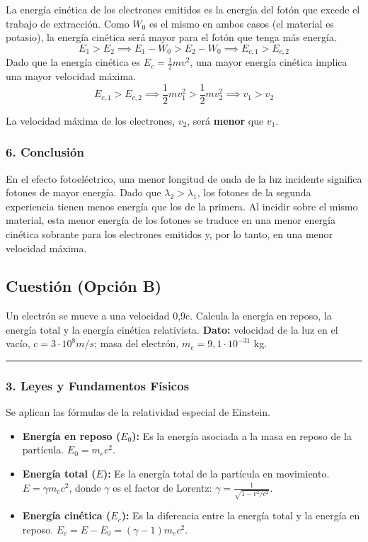 La energía cinética de los electrones emitidos es la energía del fotón que excede el trabajo de extracción. Como $W_0$ es el mismo en ambos casos (el material es potasio), la energía cinética será mayor para el fotón que tenga más energía.
$$ E_1 > E_2 \implies E_1 - W_0 > E_2 - W_0 \implies E_{c,1} > E_{c,2} $$
Dado que la energía cinética es $E_c = \frac{1}{2}mv^2$, una mayor energía cinética implica una mayor velocidad máxima.
$$ E_{c,1} > E_{c,2} \implies \frac{1}{2}mv_1^2 > \frac{1}{2}mv_2^2 \implies v_1 > v_2 $$

\begin{cajaresultado}
La velocidad máxima de los electrones, $v_2$, será \textbf{menor} que $v_1$.
\end{cajaresultado}

\subsubsection*{6. Conclusión}
\begin{cajaconclusion}
En el efecto fotoeléctrico, una menor longitud de onda de la luz incidente significa fotones de mayor energía. Dado que $\lambda_2 > \lambda_1$, los fotones de la segunda experiencia tienen menos energía que los de la primera. Al incidir sobre el mismo material, esta menor energía de los fotones se traduce en una menor energía cinética sobrante para los electrones emitidos y, por lo tanto, en una menor velocidad máxima.
\end{cajaconclusion}

\newpage

\subsection{Cuestión (Opción B)}
\label{subsec:B5_2016_jun_ord_re}

\begin{cajaenunciado}
Un electrón se mueve a una velocidad 0,9c. Calcula la energía en reposo, la energía total y la energía cinética relativista.
\textbf{Dato:} velocidad de la luz en el vacío, $c=3\cdot10^{8}m/s$; masa del electrón, $m_e=9,1\cdot10^{-31}$ kg.
\end{cajaenunciado}
\hrule

\subsubsection*{3. Leyes y Fundamentos Físicos}
Se aplican las fórmulas de la relatividad especial de Einstein.
\begin{itemize}
    \item \textbf{Energía en reposo ($E_0$):} Es la energía asociada a la masa en reposo de la partícula. $E_0 = m_e c^2$.
    \item \textbf{Energía total ($E$):} Es la energía total de la partícula en movimiento. $E = \gamma m_e c^2$, donde $\gamma$ es el factor de Lorentz: $\gamma = \frac{1}{\sqrt{1-v^2/c^2}}$.
    \item \textbf{Energía cinética ($E_c$):} Es la diferencia entre la energía total y la energía en reposo. $E_c = E - E_0 = (\gamma-1)m_e c^2$.
\end{itemize}

